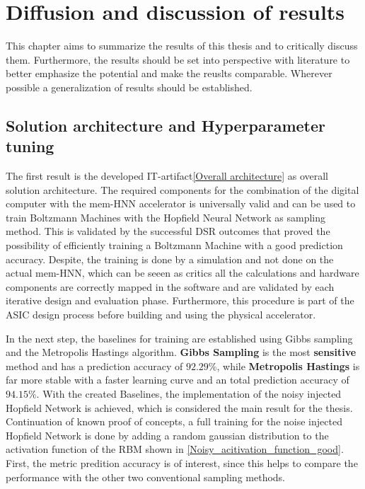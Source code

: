 \chapter{Diffusion and discussion of results}

This chapter aims to summarize the results of this thesis and to critically discuss them.
Furthermore, the results should be set into perspective with literature to better emphasize the potential
and make the reuslts comparable. 
Wherever possible a generalization of results should be established.

\section{Solution architecture and Hyperparameter tuning}

The first result is the developed \ac{IT}-artifact\ref{Overall architecture} as overall solution architecture. 
The required components for the combination of the digital computer with the \ac{mem-HNN} accelerator 
is universally valid and can be used to train Boltzmann Machines with the Hopfield Neural Network as sampling method. 
This is validated by the successful \ac{DSR} outcomes that proved the possibility of efficiently 
training a Boltzmann Machine with a good prediction accuracy.
Despite, the training is done by a simulation and not done on the actual \ac{mem-HNN}, which can be seeen as critics 
all the calculations and hardware components are correctly mapped in the software and are validated by each iterative design and evaluation phase.
Furthermore, this procedure is part of the \ac{ASIC} design process before building and using the physical accelerator.


In the next step, the baselines for training are established using Gibbs sampling and the Metropolis Hastings algorithm.
\textbf{Gibbs Sampling} is the most \textbf{sensitive} method and has a prediction accuracy of \(\mathbf{92.29\%}\), while
\textbf{Metropolis Hastings} is far more stable with a faster learning curve and an total prediction accuracy of \(\mathbf{94.15\%}\).
With the created Baselines, the implementation of the noisy injected Hopfield Network is achieved, which is considered the main result for the thesis. 
Continuation of known proof of concepts, a full training for the noise injected Hopfield Network is done by adding a random gaussian distribution 
to the activation function of the \ac{RBM} shown in \ref{Noisy_acitivation_function_good}. 
First, the metric predition accuracy is of interest, since this helps to compare the performance with the other two conventional sampling methods.

